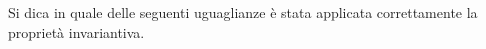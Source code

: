 Si dica in quale delle seguenti uguaglianze è stata applicata 
correttamente la proprietà invariantiva.